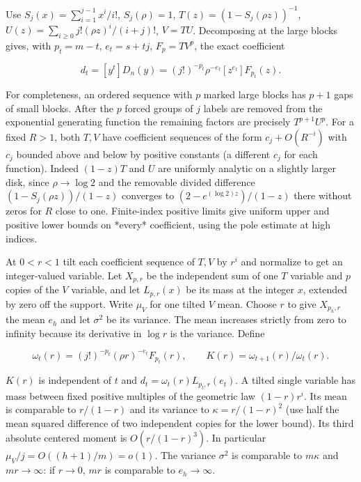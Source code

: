 \documentclass[11pt]{article}
\begin{document}
Use \(S_j(x)=\sum_{i=1}^{j-1}x^i/i!\), \(S_j(\rho)=1\), \(T(z)=(1-S_j(\rho z))^{-1}\), \(U(z)=\sum_{i\ge0}j!(\rho z)^i/(i+j)!\), \(V=T U\). Decomposing at the large blocks gives, with \(p_t=m-t\), \(e_t=s+tj\), \(F_p=T V^p\), the exact coefficient

\begin{equation*}
d_t=[y^t]D_n(y)=(j!)^{-p_t}\rho^{-e_t}[z^{e_t}]F_{p_t}(z).
\end{equation*}

For completeness, an ordered sequence with \(p\) marked large blocks has \(p+1\) gaps of small blocks. After the \(p\) forced groups of \(j\) labels are removed from the exponential generating function the remaining factors are precisely \(T^{p+1}U^p\). For a fixed \(R>1\), both \(T,V\) have coefficient sequences of the form \(c_j+O(R^{-i})\) with \(c_j\) bounded above and below by positive constants (a different \(c_j\) for each function). Indeed \((1-z)T\) and \(U\) are uniformly analytic on a slightly larger disk, since \(\rho\to\log 2\) and the removable divided difference \((1-S_j(\rho z))/(1-z)\) converges to \((2-e^{(\log2)z})/(1-z)\) there without zeros for \(R\) close to one. Finite-index positive limits give uniform upper and positive lower bounds on *every* coefficient, using the pole estimate at high indices.

At \(0<r<1\) tilt each coefficient sequence of \(T,V\) by \(r^i\) and normalize to get an integer-valued variable. Let \(X_{p,r}\) be the independent sum of one \(T\) variable and \(p\) copies of the \(V\) variable, and let \(L_{p,r}(x)\) be its mass at the integer \(x\), extended by zero off the support. Write \(\mu_V\) for one tilted \(V\) mean. Choose \(r\) to give \(X_{p_h,r}\) the mean \(e_h\) and let \(\sigma^2\) be its variance. The mean increases strictly from zero to infinity because its derivative in \(\log r\) is the variance. Define

\begin{equation*}
\omega_t(r)=(j!)^{-p_t}(\rho r)^{-e_t}F_{p_t}(r),\qquad K(r)=\omega_{t+1}(r)/\omega_t(r).
\end{equation*}

\(K(r)\) is independent of \(t\) and \(d_t=\omega_t(r)L_{p_t,r}(e_t)\). A tilted single variable has mass between fixed positive multiples of the geometric law \((1-r)r^i\). Its mean is comparable to \(r/(1-r)\) and its variance to \(\kappa=r/(1-r)^2\) (use half the mean squared difference of two independent copies for the lower bound). Its third absolute centered moment is \(O(r/(1-r)^3)\). In particular \(\mu_V/j=O((h+1)/m)=o(1)\). The variance \(\sigma^2\) is comparable to \(m\kappa\) and \(mr\to\infty\): if \(r\to0\), \(mr\) is comparable to \(e_h\to\infty\).
\end{document}
